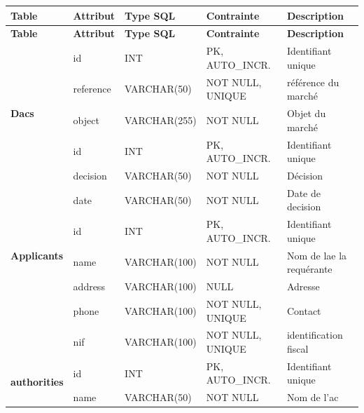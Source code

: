 \renewcommand{\arraystretch}{1.3} %

\begin{longtable}{|p{2.5cm}|p{3cm}|p{3cm}|p{3cm}|p{3cm}|}
    \hline
    \textbf{Table} & \textbf{Attribut} & \textbf{Type SQL} & \textbf{Contrainte} & \textbf{Description} \\
    \hline
    \endfirsthead

    \hline
    \textbf{Table} & \textbf{Attribut} & \textbf{Type SQL} & \textbf{Contrainte} & \textbf{Description} \\
    \hline
    \endhead

    \multirow{5}{*}{\textbf{Dacs}} & id & INT & PK, AUTO\_INCR. & Identifiant unique \\
    \cline{2-5}
    & reference & VARCHAR(50) & NOT NULL, UNIQUE & référence du marché \\
    \cline{2-5}
    & object & VARCHAR(255) & NOT NULL & Objet du marché \\
    \cline{2-5}
    \hline

    \multirow{5}{*}{\textbf{Decisions}} & id & INT & PK, AUTO\_INCR. & Identifiant unique \\
    \cline{2-5}
    & decision & VARCHAR(50) & NOT NULL & Décision \\
    \cline{2-5}
    & date & VARCHAR(50) & NOT NULL & Date de decision \\
    \cline{2-5}
    \hline

    \multirow{3}{*}{\textbf{Applicants}} & id & INT & PK, AUTO\_INCR. & Identifiant unique \\
    \cline{2-5}
    & name & VARCHAR(100) & NOT NULL & Nom de lae la requérante \\
    \cline{2-5}
    & address &  VARCHAR(100) & NULL & Adresse \\
     \cline{2-5}
    & phone & VARCHAR(100) & NOT NULL, UNIQUE & Contact \\
    \cline{2-5}
     & nif & VARCHAR(100) & NOT NULL, UNIQUE & identification fiscal \\
    \cline{2-5}
    \hline

    \multirow{2}{*}{\textbf{authorities}} & id & INT & PK, AUTO\_INCR. & Identifiant unique \\
    \cline{2-5}
    & name & VARCHAR(50) & NOT NULL & Nom de l'ac \\
    \hline


\end{longtable}
